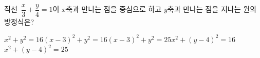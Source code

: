 직선~$\dfrac{x}{3}+\dfrac{y}{4}=1$이 $x$축과 만나는 점을 중심으로 하고 $y$축과 만나는 점을 지나는 원의 방정식은?
\begin{choicesv}{$x^2+y^2=16$}{$(x-3)^2+y^2=16$}{$(x-3)^2+y^2=25$}{$x^2+(y-4)^2=16$}{$x^2+(y-4)^2=25$}\end{choicesv}
